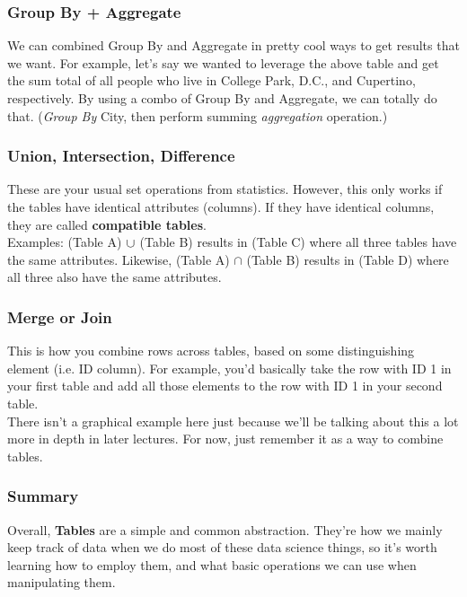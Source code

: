 \documentclass[english, 10pt]{article}
\begin{document}
\subsubsection{Group By + Aggregate}

We can combined Group By and Aggregate in pretty cool ways to get results that we want. For example, let's say we wanted to leverage the above table and get the sum total of all people who live in College Park, D.C., and Cupertino, respectively. By using a combo of Group By and Aggregate, we can totally do that. (\textit{Group By} City, then perform summing \textit{aggregation} operation.)

\subsubsection{Union, Intersection, Difference}

These are your usual set operations from statistics. However, this only works if the tables have identical attributes (columns). If they have identical columns, they are called \textbf{compatible tables}.\\

Examples: (Table A) $\cup$ (Table B) results in (Table C) where all three tables have the same attributes. Likewise, (Table A) $\cap$ (Table B) results in (Table D) where all three also have the same attributes.

\subsubsection{Merge or Join}

This is how you combine rows across tables, based on some distinguishing element (i.e. ID column). For example, you'd basically take the row with ID 1 in your first table and add all those elements to the row with ID 1 in your second table.\\

There isn't a graphical example here just because we'll be talking about this a lot more in depth in later lectures. For now, just remember it as a way to combine tables.

\subsubsection{Summary}

Overall, \textbf{Tables} are a simple and common abstraction. They're how we mainly keep track of data when we do most of these data science things, so it's worth learning how to employ them, and what basic operations we can use when manipulating them.\\
\end{document}
